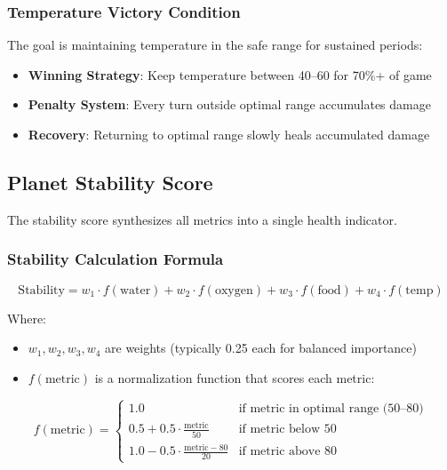\documentclass[12pt,a4paper]{article}
\begin{document}
\subsubsection{Temperature Victory Condition}

The goal is maintaining temperature in the safe range for sustained periods:
\begin{itemize}
    \item \textbf{Winning Strategy}: Keep temperature between 40--60 for 70\%+ of game
    \item \textbf{Penalty System}: Every turn outside optimal range accumulates damage
    \item \textbf{Recovery}: Returning to optimal range slowly heals accumulated damage
\end{itemize}

\subsection{Planet Stability Score}

The stability score synthesizes all metrics into a single health indicator.

\subsubsection{Stability Calculation Formula}

\begin{equation}
\text{Stability} = w_1 \cdot f(\text{water}) + w_2 \cdot f(\text{oxygen}) + w_3 \cdot f(\text{food}) + w_4 \cdot f(\text{temp})
\end{equation}

Where:
\begin{itemize}
    \item $ w_1, w_2, w_3, w_4 $ are weights (typically 0.25 each for balanced importance)
    \item $ f(\text{metric}) $ is a normalization function that scores each metric:
\end{itemize}

\begin{equation}
f(\text{metric}) = 
\begin{cases}
1.0 & \text{if metric in optimal range (50--80)} \\
0.5 + 0.5 \cdot \frac{\text{metric}}{50} & \text{if metric below 50} \\
1.0 - 0.5 \cdot \frac{\text{metric} - 80}{20} & \text{if metric above 80}
\end{cases}
\end{equation}
\end{document}
